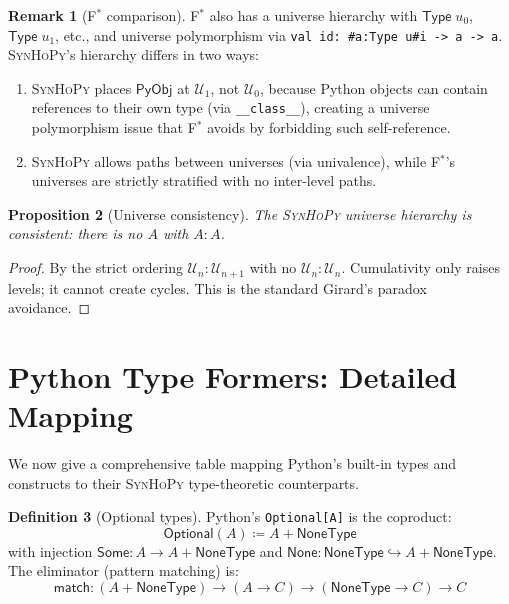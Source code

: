 \documentclass[11pt,a4paper]{report}
\theoremstyle{definition}
\newtheorem{definition}{Definition}[chapter]
\newtheorem{remark}[definition]{Remark}
\theoremstyle{plain}
\newtheorem{proposition}[definition]{Proposition}
\newcommand{\PyObj}{\mathsf{PyObj}}
\newcommand{\PyNone}{\mathsf{None}}
\newcommand{\defeq}{\coloneqq}
\newcommand{\fstar}{F$^{*}$}
\newcommand{\synhopy}{\textsc{SynHoPy}}
\begin{document}
\begin{remark}[\fstar{} comparison]
\fstar{} also has a universe hierarchy with
$\mathsf{Type}\;u_0$, $\mathsf{Type}\;u_1$, etc., and universe polymorphism
via \lstinline[style=fstar]|val id: #a:Type u#i -> a -> a|.
\synhopy{}'s hierarchy differs in two ways:
\begin{enumerate}
  \item \synhopy{} places $\PyObj$ at $\mathcal{U}_1$, not $\mathcal{U}_0$,
    because Python objects can contain references to their own type
    (via \lstinline[style=python]{__class__}), creating a universe
    polymorphism issue that \fstar{} avoids by forbidding such self-reference.
  \item \synhopy{} allows paths between universes (via univalence), while
    \fstar{}'s universes are strictly stratified with no inter-level paths.
\end{enumerate}
\end{remark}

\begin{proposition}[Universe consistency]
\label{prop:universe-consistent}
The \synhopy{} universe hierarchy is consistent: there is no $A$ with
$A : A$.
\end{proposition}
\begin{proof}
By the strict ordering $\mathcal{U}_n : \mathcal{U}_{n+1}$ with no
$\mathcal{U}_n : \mathcal{U}_n$.  Cumulativity only raises levels; it
cannot create cycles.  This is the standard Girard's paradox avoidance.
\end{proof}


\section{Python Type Formers: Detailed Mapping}

We now give a comprehensive table mapping Python's built-in types and constructs
to their \synhopy{} type-theoretic counterparts.

\begin{definition}[Optional types]
Python's \lstinline[style=python]{Optional[A]} is the coproduct:
\[
  \mathsf{Optional}(A) \defeq A + \mathsf{NoneType}
\]
with injection $\mathsf{Some} : A \to A + \mathsf{NoneType}$ and
$\PyNone : \mathsf{NoneType} \hookrightarrow A + \mathsf{NoneType}$.
The eliminator (pattern matching) is:
\[
  \mathsf{match} : (A + \mathsf{NoneType}) \to (A \to C) \to (\mathsf{NoneType} \to C) \to C
\]
\end{definition}
\end{document}
